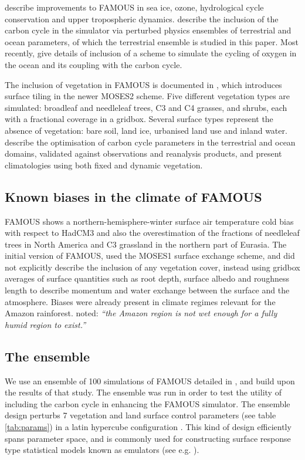 \documentclass[esd, manuscript]{copernicus}
\begin{document}
\cite{smith2012famous} describe improvements to FAMOUS in sea ice, ozone, hydrological cycle conservation and upper tropospheric dynamics. \cite{williams2013optimising} describe the inclusion of the carbon cycle in the simulator via perturbed physics ensembles of terrestrial and ocean parameters, of which the terrestrial ensemble is studied in this paper. Most recently, \cite{williams2014oxygen} give details of inclusion of a scheme to simulate the cycling of oxygen in the ocean and its coupling with the carbon cycle.

The inclusion of vegetation in FAMOUS is documented in \cite{williams2013optimising}, which introduces surface tiling in the newer MOSES2 scheme. Five different vegetation types are simulated: broadleaf and needleleaf trees, C3 and C4 grasses, and shrubs, each with a fractional coverage in a gridbox. Several surface types represent the absence of vegetation: bare soil, land ice, urbanised land use and inland water. \cite{williams2013optimising} describe the optimisation of carbon cycle parameters in the terrestrial and ocean domains, validated against observations and reanalysis products, and present climatologies using both fixed and dynamic vegetation. 

\subsection{Known biases in the climate of FAMOUS}\label{ssec:biases}

FAMOUS shows a northern-hemisphere-winter surface air temperature cold bias with respect to HadCM3 and also the overestimation of the fractions of needleleaf trees in North America and C3 grassland in the northern part of Eurasia. The initial version of FAMOUS, used the MOSES1 surface exchange scheme, and did not explicitly describe the inclusion of any vegetation cover, instead using gridbox averages of surface quantities such as root depth, surface albedo and roughness length to describe momentum and water exchange between the surface and the atmosphere. Biases were already present in climate regimes \citep{gnanadesikan2006diagnosing} relevant for the Amazon rainforest. \cite{smith2008famous} noted: \emph{``the Amazon region is not wet enough for a fully humid region to exist.''}

\subsection{The ensemble}
We use an ensemble of 100 simulations of FAMOUS detailed in \cite{williams2013optimising}, and build upon the results of that study. The ensemble was run in order to test the utility of including the carbon cycle in enhancing the FAMOUS simulator. The ensemble design perturbs 7 vegetation and land surface control parameters (see table \ref{tab:params}) in a latin hypercube configuration \citep{mckay1979comparison}. This kind of design efficiently spans parameter space, and is commonly used for constructing surface response type statistical models known as emulators (see e.g. \citep{urban2010comparison}).
\end{document}
